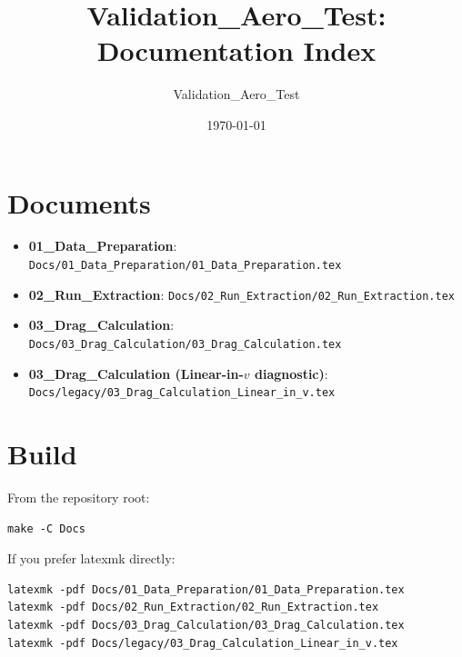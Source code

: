 \documentclass[11pt,a4paper]{article}
\title{Validation\_Aero\_Test: Documentation Index}
\author{Validation\_Aero\_Test}
\date{\today}
\begin{document}
\maketitle

\section*{Documents}
\begin{itemize}
  \item \textbf{01\_Data\_Preparation}: \texttt{Docs/01\_Data\_Preparation/01\_Data\_Preparation.tex}
  \item \textbf{02\_Run\_Extraction}: \texttt{Docs/02\_Run\_Extraction/02\_Run\_Extraction.tex}
  \item \textbf{03\_Drag\_Calculation}: \texttt{Docs/03\_Drag\_Calculation/03\_Drag\_Calculation.tex}
  \item \textbf{03\_Drag\_Calculation (Linear-in-\(v\) diagnostic)}: \texttt{Docs/legacy/03\_Drag\_Calculation\_Linear\_in\_v.tex}
\end{itemize}

\section*{Build}
From the repository root:
\begin{verbatim}
make -C Docs
\end{verbatim}

If you prefer latexmk directly:
\begin{verbatim}
latexmk -pdf Docs/01_Data_Preparation/01_Data_Preparation.tex
latexmk -pdf Docs/02_Run_Extraction/02_Run_Extraction.tex
latexmk -pdf Docs/03_Drag_Calculation/03_Drag_Calculation.tex
latexmk -pdf Docs/legacy/03_Drag_Calculation_Linear_in_v.tex
\end{verbatim}
\end{document}
